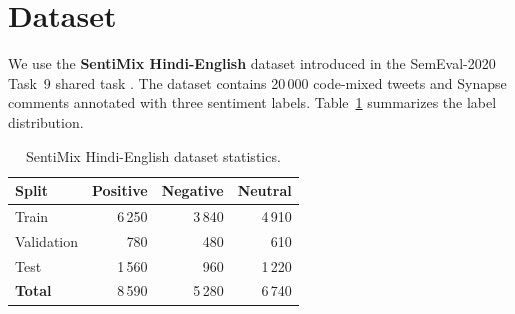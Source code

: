 \section{Dataset}

We use the \textbf{SentiMix Hindi-English} dataset introduced in the SemEval-2020 Task~9 shared task \cite{patwa2020}. The dataset contains 20\,000 code-mixed tweets and Synapse comments annotated with three sentiment labels. Table~\ref{tab:dataset} summarizes the label distribution.

\begin{table}[htbp]
\centering
\caption{SentiMix Hindi-English dataset statistics.}
\label{tab:dataset}
\begin{tabular}{@{}lrrr@{}}
\toprule
\textbf{Split} & \textbf{Positive} & \textbf{Negative} & \textbf{Neutral} \\
\midrule
Train      & 6\,250 & 3\,840 & 4\,910 \\
Validation &   780  &   480  &   610  \\
Test       & 1\,560 &   960  & 1\,220 \\
\midrule
\textbf{Total} & 8\,590 & 5\,280 & 6\,740 \\
\bottomrule
\end{tabular}
\end{table}
